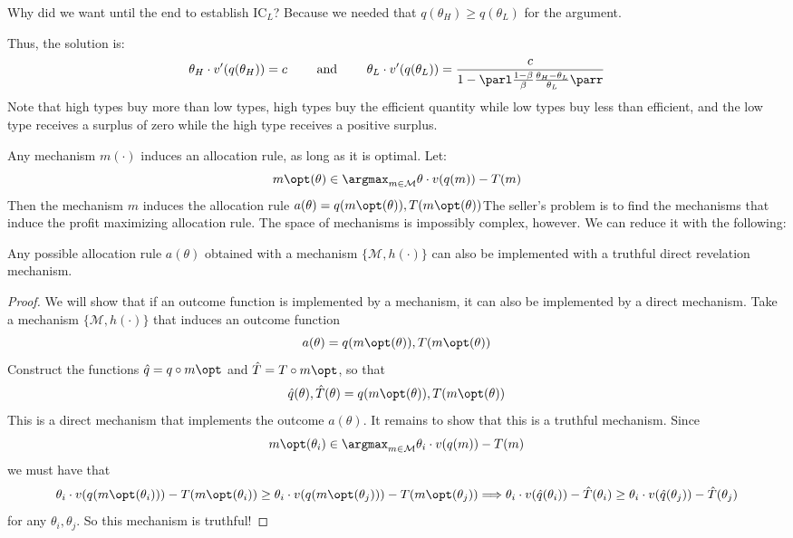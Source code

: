 \documentclass[10pt]{article}
\begin{document}
\begin{example}
	\begin{question}
		Why did we want until the end to establish IC$_L$? Because we needed that $q(\theta_H) \ge q(\theta_L)$ for the argument. 
	\end{question}
	Thus, the solution is:\[\theta_H \cdot v'(q(\theta_H)) = c \qquad \text{ and } \qquad \theta_L \cdot v'(q(\theta_L)) = \frac{c}{1-\parl \frac{1-\beta}{\beta}\frac{\theta_H-\theta_L}{\theta_L}\parr}\]Note that high types buy more than low types, high types buy the efficient quantity while low types buy less than efficient, and the low type receives a surplus of zero while the high type receives a positive surplus.
\end{example}


\begin{remark}
	Any mechanism $m(\cdot)$ induces an allocation rule, as long as it is optimal. Let:\[m\opt(\theta) \in \argmax_{m\in\mathcal{M}} \theta \cdot v(q(m)) - T(m)\]Then the mechanism $m$ induces the allocation rule $a(\theta) = q(m\opt(\theta)),T(m\opt(\theta))$The seller's problem is to find the mechanisms that induce the profit maximizing allocation rule. The space of mechanisms is impossibly complex, however. We can reduce it with the following:
\end{remark}

\begin{theorem}
	 Any possible allocation rule $a(\theta)$ obtained with a mechanism $\{\mathcal{M},h(\cdot)\}$ can also be implemented with a truthful direct revelation mechanism.
\end{theorem}
\begin{proof}
	We will show that if an outcome function is implemented by a mechanism, it can also be implemented by a direct mechanism. Take a mechanism $\{\mathcal{M},h(\cdot)\}$ that induces an outcome function\[a(\theta) = q(m\opt(\theta)),T(m\opt(\theta))\]Construct the functions $\hat{q} = q \circ m\opt$ and $\hat{T} = T \circ m\opt$, so that \[\hat{q}(\theta),\hat{T}(\theta) = q(m\opt(\theta)),T(m\opt(\theta))\]This is a direct mechanism that implements the outcome $a(\theta)$. It remains to show that this is a truthful mechanism. Since\[m\opt(\theta_i) \in \argmax_{m \in \mathcal{M}} \theta_i \cdot v(q(m)) - T(m)\]we must have that\[\theta_i \cdot v(q(m\opt(\theta_i))) - T(m\opt(\theta_i)) \ge \theta_i \cdot v(q(m\opt(\theta_j))) - T(m\opt(\theta_j)) \Longrightarrow \theta_i \cdot v(\hat{q}(\theta_i)) - \hat{T}(\theta_i) \ge \theta_i \cdot v(\hat{q}(\theta_j)) - \hat{T}(\theta_j)\]for any $\theta_i,\theta_j$. So this mechanism is truthful!
\end{proof}
\end{document}
